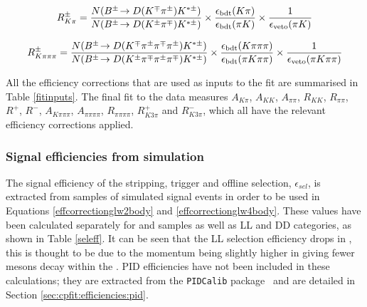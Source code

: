 {\footnotesize
\begin{equation}
R^{\pm}_{K\pi} = \frac{N({{B}^\pm}\!\rightarrow {\ensuremath{D}}({{K}^\mp}{{\pi}^\pm}){{K}^{*\pm}})}{N({{B}^\pm}\!\rightarrow {\ensuremath{D}}({{K}^\pm}{{\pi}^\mp}){{K}^{*\pm}})} \times \frac{\epsilon_{\text{bdt}}(K\pi)}{\epsilon_{\text{bdt}}(\pi K)} \times \frac{1}{\epsilon_{\text{veto}}(\pi K)}
\label{effcorrectionads2body}
\end{equation}

\begin{equation}
R^{\pm}_{K\pi\pi\pi} = \frac{N({{B}^\pm}\!\rightarrow {\ensuremath{D}}({{K}^\mp}{{\pi}^\pm}{{\pi}^\mp}{{\pi}^\pm}){{K}^{*\pm}})}{N({{B}^\pm}\!\rightarrow {\ensuremath{D}}({{K}^\pm}{{\pi}^\mp}{{\pi}^\pm}{{\pi}^\mp}){{K}^{*\pm}})} \times \frac{\epsilon_{\text{bdt}}(K\pi\pi\pi)}{\epsilon_{\text{bdt}}(\pi K\pi\pi)} \times \frac{1}{\epsilon_{\text{veto}}(\pi K\pi\pi)}
\label{effcorrectionads4body}
\end{equation}}

All the efficiency corrections that are used as inputs to the fit are summarised in Table \ref{fitinputs}. The final fit to the data measures $A_{K\pi}$, $A_{KK}$, $A_{\pi\pi}$, $R_{KK}$, $R_{\pi\pi}$, $R^+$,  $R^-$, $A_{K\pi\pi\pi}$, $A_{\pi\pi\pi\pi}$, $R_{\pi\pi\pi\pi}$, $R^+_{K3\pi}$ and  $R^-_{K3\pi}$, which all have the relevant efficiency corrections applied.


\subsubsection{Signal efficiencies from simulation}
\label{sec:cpfit:efficiencies:signal}

The signal efficiency of the stripping, trigger and offline selection, $\epsilon_{sel}$, is extracted from samples of simulated signal events in order to be used in Equations \ref{effcorrectionglw2body} and \ref{effcorrectionglw4body}. These values have been calculated separately for \runone and \runtwo samples as well as LL and DD categories, as shown in Table \ref{seleff}. It can be seen that the LL selection efficiency drops in \runtwo, this is thought to be due to the \KS momentum being slightly higher in \runtwo giving fewer \KS mesons decay within the \velo. PID efficiencies have not been included in these calculations; they are extracted from the {\tt PIDCalib} package~\cite{PIDCalib} and are detailed in Section \ref{sec:cpfit:efficiencies:pid}.

